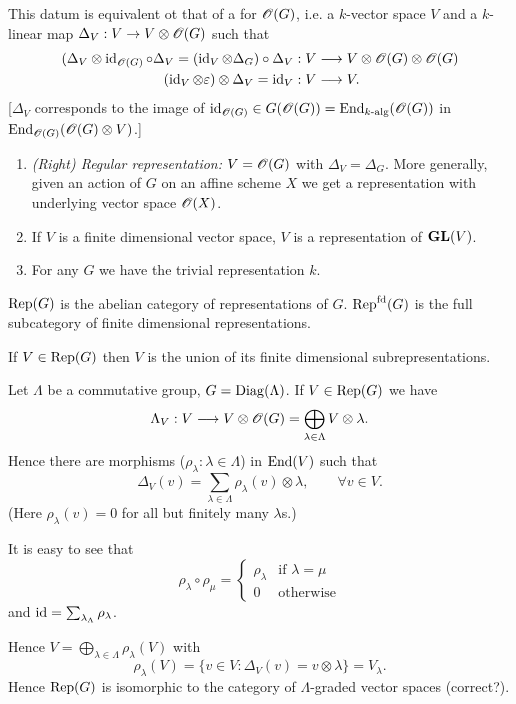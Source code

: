 This datum is equivalent ot that of a  for $\mathscr{O}(G)$, i.e. a $k$-vector space $V$ and a $k$-linear map $\Delta_V:V\to V\otimes \OO(G)$ such that
\begin{align*}
	(\Delta_V\otimes\id_{\OO(G)}\circ \Delta_V = (\id_V\otimes \Delta_G)\circ \Delta_V &:V\to V\otimes\OO(G)\otimes\OO(G) \\
	(\id_V\otimes \eps)\otimes \Delta_V = \id_V &:V\to V.
\end{align*}
[$\Delta_V$ corresponds to the image of $\operatorname{id}_{\mathscr{O}(G)}\in G(\mathscr{O}(G))=\operatorname{End}_{k\text{-alg}}(\mathscr{O}(G))$ in $\operatorname{End}_{\mathscr{O}(G)}(\mathscr{O}(G)\otimes V)$.]
\begin{example} \leavevmode
	\begin{enumerate}[(1)]
		\item \emph{(Right) Regular representation:} $V=\mathscr{O}(G)$ with $\Delta_V=\Delta_G$. More generally, given an action of $G$ on an affine scheme $X$ we get a representation with underlying vector space $\mathscr{O}(X)$.
		\item If $V$ is a finite dimensional vector space, $V$ is a representation of $\mathbf{GL}(V)$.
		\item For any $G$ we have the trivial representation $k$.
	\end{enumerate}
\end{example}
\begin{notation}
	$\operatorname{Rep}(G)$ is the abelian category of representations of $G$. $\operatorname{Rep}^{\text{fd}}(G)$ is the full subcategory of finite dimensional representations.
\end{notation}

If $V\in \operatorname{Rep}(G)$ then $V$ is the union of its finite dimensional subrepresentations.

\begin{example}
	Let $\Lambda$ be a commutative group, $G=\operatorname{Diag}(\Lambda)$. If $V\in \operatorname{Rep}(G)$ we have
	\[
	\Lambda_V:V\to V\otimes\OO(G) = \bigoplus_{\lambda\in \Lambda}V\otimes\lambda
	.\] 
	Hence there are morphisms ($\rho_\lambda:\lambda\in \Lambda$) in $\operatorname{End}(V)$ such that
	\[
	\Delta_V(v) = \sum_{\lambda\in \Lambda} \rho_\lambda(v)\otimes\lambda,\qquad \forall v\in V.
	\] 
	(Here $\rho_\lambda(v)=0$ for all but finitely many $\lambda$s.)

	It is easy to see that
	\[
	\rho_\lambda\circ\rho_\mu = \begin{cases}
		\rho_\lambda & \text{if }\lambda=\mu \\
		0 & \text{otherwise}
	\end{cases}
	\]
	and $\operatorname{id} = \sum_{\lambda_\Lambda}\rho_\lambda$.

	Hence $V=\bigoplus_{\lambda\in \Lambda}\rho_\lambda(V)$ with
	\[
	\rho_\lambda(V) = \{v\in V : \Delta_V(v) = v\otimes \lambda\} = V_\lambda
	.\] 
	Hence $\operatorname{Rep}(G)$ is isomorphic to the category of $\Lambda$-graded vector spaces (correct?).
\end{example}
